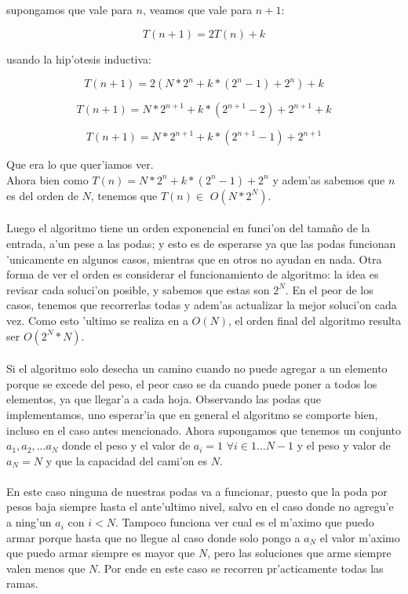 supongamos que vale para $n$, veamos que vale para $n+1$:

$$T(n+1) = 2T(n) + k$$

usando la hip'otesis inductiva:

$$T(n+1) = 2(N*2^n + k*(2^n-1) + 2^n) + k$$

$$T(n+1) = N*2^{n+1} + k*(2^{n+1}-2) + 2^{n+1} + k$$

$$T(n+1) = N*2^{n+1} + k*(2^{n+1}-1) + 2^{n+1}$$

Que era lo que quer'iamos ver.\\

Ahora bien como $T(n) = N*2^n + k*(2^n-1) + 2^n$ y adem'as sabemos que $n$ es del orden de $N$, tenemos que $T(n) \in$ $O(N*2^N)$.
\paragraph{}
Luego el algoritmo tiene un orden exponencial en funci'on del tama\~{n}o de la entrada, a'un pese a las podas; 
y esto es de esperarse ya que las podas funcionan 'unicamente en algunos casos, mientras que en otros no ayudan 
en nada. Otra forma de ver el orden es considerar el funcionamiento de algoritmo: la idea es revisar cada soluci'on 
posible, y sabemos que estas son $2^N$. En el peor de los casos, tenemos que recorrerlas todas y adem'as actualizar 
la mejor soluci'on cada vez. Como esto 'ultimo se realiza en a $O(N)$, el orden final del algoritmo resulta ser $O(2^N*N)$.
\paragraph{}
Si el algoritmo solo desecha un camino cuando no puede agregar a un elemento porque se excede del peso, el peor 
caso se da cuando puede poner a todos los elementos, ya que llegar'a a cada hoja. Observando las podas que implementamos, 
uno esperar'ia que en general el algoritmo se comporte bien, incluso en el caso antes mencionado. Ahora supongamos que 
tenemos un conjunto ${a_1,a_2,...a_N}$ donde el peso y el valor de $a_i = 1$ $\forall i \in {1...N-1}$ y el peso y valor de  
$a_N = N$ y que la capacidad del cami'on es $N$.
\paragraph{}
En este caso ninguna de nuestras podas va a funcionar, puesto que la poda por pesos baja siempre hasta el ante'ultimo nivel,
salvo en el caso donde no agregu'e a ning'un $a_i$ con $i < N$. Tampoco funciona ver cual es el m'aximo que puedo armar 
porque hasta que no llegue al caso donde solo pongo a $a_N$ el valor m'aximo que puedo armar siempre es mayor que $N$, 
pero las soluciones que arme siempre valen menos que $N$. Por ende en este caso se recorren pr'acticamente todas las ramas. 

